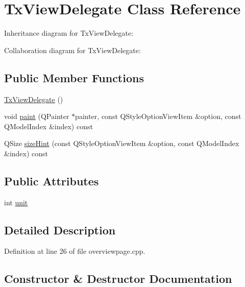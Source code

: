 \hypertarget{class_tx_view_delegate}{}\section{Tx\+View\+Delegate Class Reference}
\label{class_tx_view_delegate}


Inheritance diagram for Tx\+View\+Delegate\+:


Collaboration diagram for Tx\+View\+Delegate\+:
\subsection*{Public Member Functions}
\begin{DoxyCompactItemize}
\item 
\hyperlink{class_tx_view_delegate_a275fb9b088109b84c9d9d8f8cae0c67d}{Tx\+View\+Delegate} ()
\item 
void \hyperlink{class_tx_view_delegate_affeec94c01339a5eeb31b648c41baf02}{paint} (Q\+Painter $\ast$painter, const Q\+Style\+Option\+View\+Item \&option, const Q\+Model\+Index \&index) const 
\item 
Q\+Size \hyperlink{class_tx_view_delegate_ab5fd43199d65a643bc1b631a8025a421}{size\+Hint} (const Q\+Style\+Option\+View\+Item \&option, const Q\+Model\+Index \&index) const 
\end{DoxyCompactItemize}
\subsection*{Public Attributes}
\begin{DoxyCompactItemize}
\item 
int \hyperlink{class_tx_view_delegate_a4281e394dd7e90ecd8401fdca7b0413a}{unit}
\end{DoxyCompactItemize}


\subsection{Detailed Description}


Definition at line 26 of file overviewpage.\+cpp.



\subsection{Constructor \& Destructor Documentation}
\hypertarget{class_tx_view_delegate_a275fb9b088109b84c9d9d8f8cae0c67d}{}
